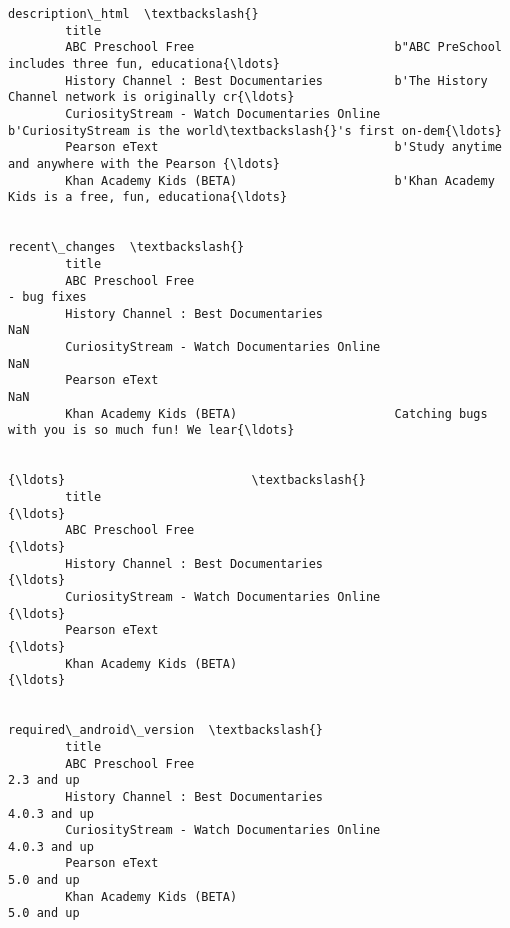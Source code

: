 \documentclass[11pt]{article}
\begin{document}
\begin{Verbatim}[commandchars=\\\{\}]
                                                                                       description\_html  \textbackslash{}
        title                                                                                             
        ABC Preschool Free                            b"ABC PreSchool includes three fun, educationa{\ldots}   
        History Channel : Best Documentaries          b'The History Channel network is originally cr{\ldots}   
        CuriosityStream - Watch Documentaries Online  b'CuriosityStream is the world\textbackslash{}'s first on-dem{\ldots}   
        Pearson eText                                 b'Study anytime and anywhere with the Pearson {\ldots}   
        Khan Academy Kids (BETA)                      b'Khan Academy Kids is a free, fun, educationa{\ldots}   
        
                                                                                         recent\_changes  \textbackslash{}
        title                                                                                             
        ABC Preschool Free                                                                  - bug fixes   
        History Channel : Best Documentaries                                                        NaN   
        CuriosityStream - Watch Documentaries Online                                                NaN   
        Pearson eText                                                                               NaN   
        Khan Academy Kids (BETA)                      Catching bugs with you is so much fun! We lear{\ldots}   
        
                                                                            {\ldots}                          \textbackslash{}
        title                                                               {\ldots}                           
        ABC Preschool Free                                                  {\ldots}                           
        History Channel : Best Documentaries                                {\ldots}                           
        CuriosityStream - Watch Documentaries Online                        {\ldots}                           
        Pearson eText                                                       {\ldots}                           
        Khan Academy Kids (BETA)                                            {\ldots}                           
        
                                                      required\_android\_version  \textbackslash{}
        title                                                                    
        ABC Preschool Free                                          2.3 and up   
        History Channel : Best Documentaries                      4.0.3 and up   
        CuriosityStream - Watch Documentaries Online              4.0.3 and up   
        Pearson eText                                               5.0 and up   
        Khan Academy Kids (BETA)                                    5.0 and up   
        

\end{Verbatim}
\end{document}
